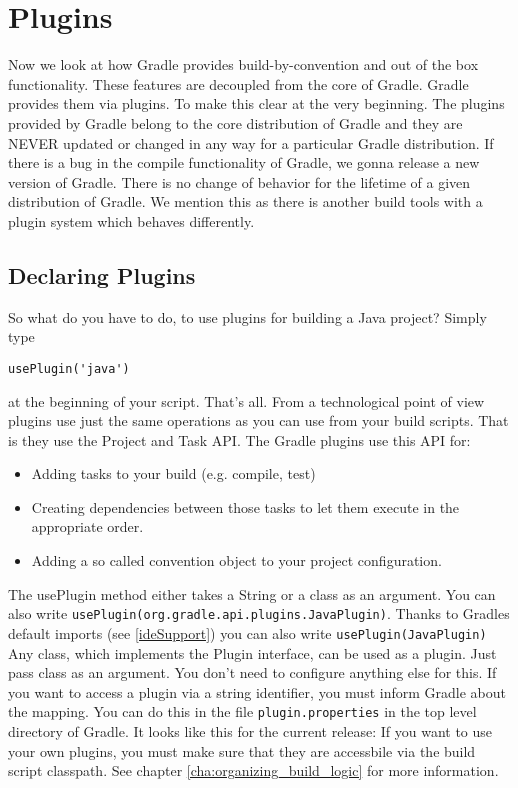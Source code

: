 \chapter{Plugins} %
\label{cha:plugins}
Now we look at how Gradle provides build-by-convention and out of the box functionality. These features are decoupled from the core of Gradle. Gradle provides them via plugins. To make this clear at the very beginning. The plugins provided by Gradle belong to the core distribution of Gradle and they are NEVER updated or changed in any way for a particular Gradle distribution. If there is a bug in the compile functionality of Gradle, we gonna release a new version of Gradle. There is no change of behavior for the lifetime of a given distribution of Gradle. We mention this as there is another build tools with a plugin system which behaves differently. 

\section{Declaring Plugins} %
\label{sec:using_plugins}
So what do you have to do, to use plugins for building a Java project? Simply type
\begin{Verbatim}
usePlugin('java')	
\end{Verbatim}
at the beginning of your script. That's all. From a technological point of view plugins use just the same operations as you can use from your build scripts. That is they use the Project and Task API. The Gradle plugins use this API for:
\begin{itemize}
	\item Adding tasks to your build (e.g. compile, test)
    \item Creating dependencies between those tasks to let them execute in the appropriate order.
    \item Adding a so called convention object to your project configuration.
\end{itemize}
The usePlugin method either takes a String or a class as an argument. You can also write \texttt{usePlugin(org.gradle.api.plugins.JavaPlugin)}. Thanks to Gradles default imports (see \ref{ideSupport}) you can also write \texttt{usePlugin(JavaPlugin)}
Any class, which implements the Plugin interface, can be used as a plugin. Just pass class as an argument. You don't need to configure anything else for this. If you want to access a plugin via a string identifier, you must inform Gradle about the mapping. You can do this in the file \texttt{plugin.properties} in the top level directory of Gradle. It looks like this for the current release:
If you want to use your own plugins, you must make sure that they are accessbile via the build script classpath. See chapter \ref{cha:organizing_build_logic} for more information.

